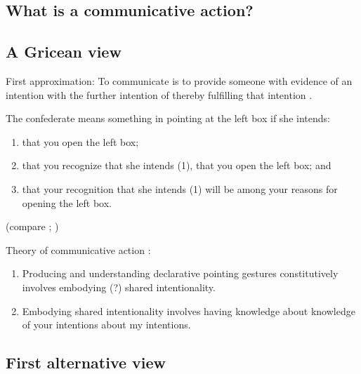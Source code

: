 \documentclass[12pt]{extarticle}
\begin{document}
\begin{multicols}{3}
 
 
\section{What is a communicative action?}
 
\subsection{A Gricean view}
 
First approximation: To communicate is to provide someone with evidence of an intention with the further intention of thereby fulfilling that intention
\citep[compare][chapter 14]{Grice:1989ha}.
 
The confederate means something in pointing at the left box if she intends:
 
\begin{enumerate}
 
\item
 
that you open the left box;
 
\item
 
that you recognize that she intends (1), that you open the left box; and
 
\item
 
that your recognition that she intends (1) will be among your reasons for opening the left box.
 
\end{enumerate}
 
(compare \citealp[p.\ 151]{Grice:1969pv}; \citealp[p.\ 544]{Neale:1992uw})
 
Theory of communicative action \citep[compare][]{Tomasello:2007fi}:
 
\begin{enumerate}
 
\item
 
Producing and understanding declarative pointing gestures constitutively involves embodying (?) shared intentionality.
 
\item
 
Embodying shared intentionality involves having knowledge about knowledge of your intentions about my intentions.
 
\end{enumerate}
 
\subsection{First alternative view}
 

\end{multicols}
\end{document}

